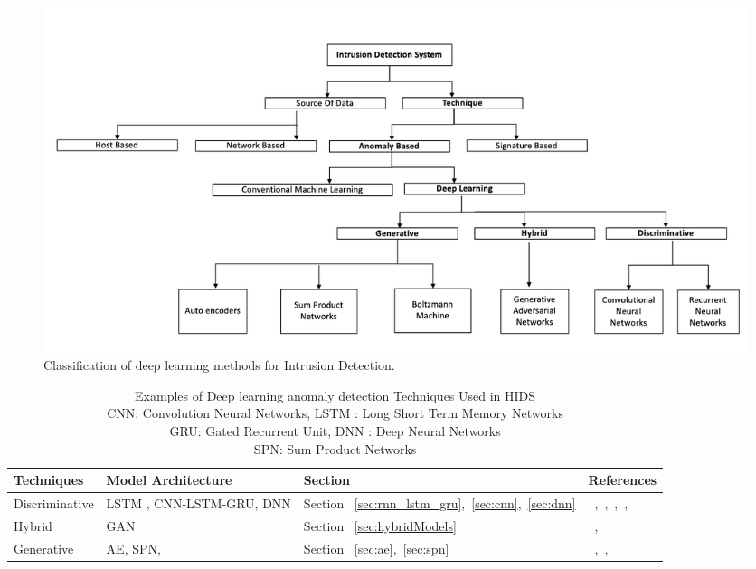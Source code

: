 \begin{figure}
\includegraphics[scale=0.5]{images/IDS}
\captionsetup{justification=centering}
\caption{Classification of deep learning methods for Intrusion Detection.}
\label{fig:deepADforIDS}
\end{figure}


\begin{table}
\begin{center}
\caption{Examples of Deep learning anomaly detection Techniques Used in HIDS
          \\CNN: Convolution Neural Networks, LSTM : Long Short Term Memory Networks
          \\GRU: Gated Recurrent Unit, DNN : Deep Neural Networks
          \\SPN: Sum Product Networks}
  \label{tab:HIDS}
    \begin{tabular}{ | l | p{4cm} | l | p{5cm} |}
    \hline
    Techniques & Model Architecture & Section & References \\ \hline
    Discriminative &  LSTM , CNN-LSTM-GRU, DNN & Section ~\ref{sec:rnn_lstm_gru},~\ref{sec:cnn},~\ref{sec:dnn} &  ~\cite{kim2016lstm},~\cite{chawla2018host},~\cite{chen2018henet},~\cite{sohi2018recurrent},~\cite{vinayakumar2017applying} \\\hline
    Hybrid &  GAN & Section ~\ref{sec:hybridModels} & ~\cite{aghakhani2018detecting}, ~\cite{li2018anomaly} \\\hline
    Generative &  AE, SPN,  & Section ~\ref{sec:ae},~\ref{sec:spn} & ~\cite{gao2014intrusion},~\cite{peharz2018probabilistic},~\cite{umer2018two} \\
    \hline
    \end{tabular}
\end{center}
\end{table}




